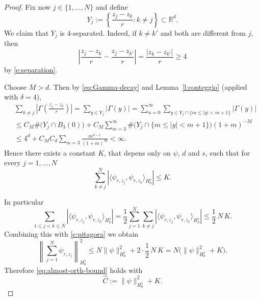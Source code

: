 \documentclass[10pt,a4paper]{amsart}
\newcommand{\Fhat}[1]{\widehat{#1}}
\newcommand{\R}{\mathbb{R}}
\begin{document}
\begin{proof}
Fix now $j\in\{1,\dots,N\}$ and define
\begin{equation*}
Y_j:=\left\{\frac{z_j-z_k}{r}:k\neq j\right\}\subset\R^d.    
\end{equation*}
We claim that $Y_j$ is $4$-separated. Indeed, if $k\neq k'$ and both are different from $j$, then
\begin{equation*}
\left|\frac{z_j-z_k}{r}-\frac{z_j-z_{k'}}{r}
\right|
=
\frac{|z_k-z_{k'}|}{r}
\ge 4    
\end{equation*}
by \eqref{e:separation}. 

Choose $M>d$. Then by \eqref{eq:Gamma-decay} and Lemma~\ref{l:conteggio} (applied with $\delta=4$),
\begin{align*}
  &  \sum_{k\neq j}
\left|
\Gamma\left(\frac{z_j-z_k}{r}\right)
\right|
=
\sum_{y\in Y_j} |\Gamma(y)|=\sum_{n=0}^\infty
\sum_{y\in Y_j\cap\{m\le |y|<m+1\}} |\Gamma(y)| \\ & \leq  C_M\#\bigl(Y_j\cap B_3(0)\bigr)+  C_M
\sum_{m=3}^\infty
\#\bigl(Y_j\cap\{m\le |y|<m+1\}\bigr)(1+m)^{-M} \\ & \leq 4^d+ C_MC_d \sum_{m=3} \frac{m^{d-1}}{(1+m)^M}<\infty.
\end{align*}
 Hence there exists a constant $K$, that depens only on $\psi$, $d$ and $s$, such that for every $j=1,\dots,N$
\begin{equation*}
\sum_{k\neq j}^N
\left|
\langle \psi_{r,z_j},\psi_{r,z_k}\rangle_{H_0^s}
\right|
\le K.
\end{equation*}

In particular
\begin{equation*}
\sum_{1\le j<k\le N}
\left|
\langle \psi_{r,z_j},\psi_{r,z_k}\rangle_{H_0^s}
\right|
=
\frac12
\sum_{j=1}^N
\sum_{k\neq j}
\left|
\langle \psi_{r,z_j},\psi_{r,z_k}\rangle_{H_0^s}
\right|
\le
\frac12\,N\,K.    
\end{equation*}
Combining this with \eqref{e:pitagora} we obtain
\begin{equation*}
\left\|\sum_{j=1}^N \psi_{r,z_j}\right\|_{H_0^s}^2
\le
N\|\psi\|_{H_0^s}^2 + 2\cdot \frac12\,N\,K
=
N\bigl(\|\psi\|_{H_0^s}^2 + K\bigr).    
\end{equation*}
Therefore \eqref{eq:almost-orth-bound} holds with
\begin{equation*}
\Fhat{C}:=\|\psi\|_{H_0^s}^2 + K.    
\end{equation*}
\end{proof}
\end{document}
